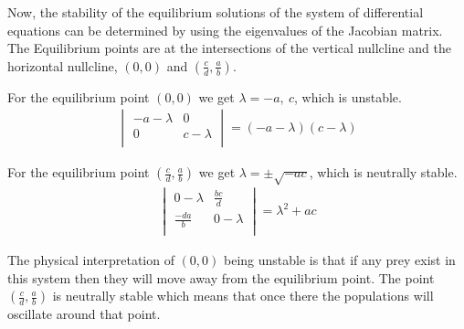 \documentclass[12pt]{article}   %
\theoremstyle{definition}
\numberwithin{equation}{section}
\begin{document}
\quad Now, the stability of the equilibrium solutions of the system of differential equations can be determined by using the eigenvalues of the Jacobian matrix. The Equilibrium points are at the intersections of the vertical nullcline and the horizontal nullcline, $(0,0)$ and $(\frac{c}{d},\frac{a}{b})$.  

For the equilibrium point $(0,0)$ we get $\lambda=-a,\ c$, which is unstable.
\begin{align*}
\begin{vmatrix}
	-a-\lambda &0\\
	0& c-\lambda\\
\end{vmatrix}
=(-a-\lambda)(c-\lambda)
\end{align*}

For the equilibrium point $(\frac{c}{d},\frac{a}{b})$ we get $\lambda=\pm\sqrt{-ac}$, which is neutrally stable.
\begin{align*}
\begin{vmatrix}
	0-\lambda & \frac{bc}{d}\\
	\frac{-da}{b} & 0-\lambda\\
\end{vmatrix}
=\lambda^2+ac
\end{align*}

\quad The physical interpretation of $(0,0)$ being unstable is that if any prey exist in this system then they will move away from the equilibrium point. The point $(\frac{c}{d},\frac{a}{b})$ is neutrally stable which means that once there the populations will oscillate around that point. 

\end{document}
